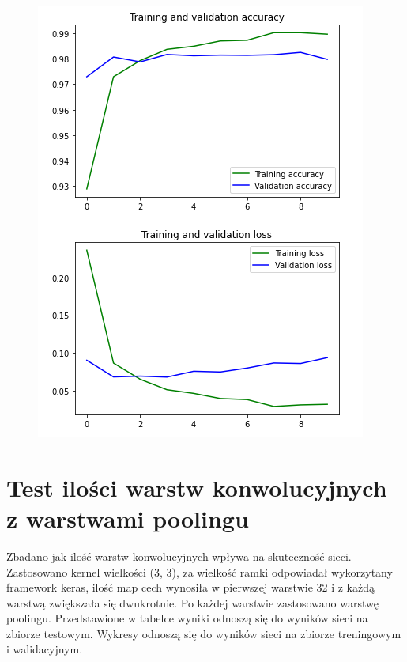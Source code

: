 \documentclass{article}
\begin{document}
\newpage
\begin{figure}[h]
  \centering
  \includegraphics[width=\linewidth]{conv_compare.png}
\end{figure}

\newpage
\section{Test ilości warstw konwolucyjnych z warstwami poolingu}

Zbadano jak ilość warstw konwolucyjnych wpływa na skuteczność sieci. Zastosowano kernel wielkości (3, 3), 
za wielkość ramki odpowiadał wykorzytany framework keras, ilość map cech wynosiła w pierwszej warstwie 32 i z każdą warstwą zwiększała się dwukrotnie.
Po każdej warstwie zastosowano warstwę poolingu.
Przedstawione w tabelce wyniki odnoszą się do wyników sieci na zbiorze testowym. Wykresy odnoszą się do wyników sieci na zbiorze treningowym i walidacyjnym.
\end{document}
